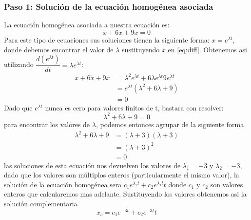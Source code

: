     \subsubsection*{Paso 1: Solución de la ecuación homogénea asociada}
        La ecuación homogénea asociada a nuestra ecuación es:
        \begin{equation}
            \ddot{x} + 6\dot{x} + 9x = 0
            \label{eq:diff}
        \end{equation}
        Para este tipo de ecuaciones sus soluciones tienen la siguiente forma: $x = e^{\lambda t} $, donde debemos encontrar el
        valor de $\lambda$ sustituyendo $ x $ en \eqref{eq:diff}. Obtenemos asi utilizando 
        $\dfrac {d( e^{\lambda t} )}{d t}=\lambda e^{\lambda t}$:
        \begin{equation*}
            \begin{split}
                \ddot{x} + 6\dot{x} + 9x & = \lambda^2 e^{\lambda t} + 6\lambda e^{\lambda t} 9 e^{\lambda t}\\
                & = e^{\lambda t}(\lambda^2 + 6\lambda + 9) \\
                & = 0
            \end{split}
        \end{equation*}
        Dado que $ e^{\lambda t} $ nunca es cero para valores finitos de t, bastara con resolver:
        \begin{equation*}
            \lambda^2 + 6\lambda + 9 = 0
        \end{equation*}
        para encontrar los valores de $\lambda$, podemos entonces agrupar de la siguiente forma
        \begin{equation*}
            \begin{split}
                \lambda^2 + 6\lambda + 9 & = (\lambda + 3)(\lambda + 3)\\
                & = (\lambda + 3)^2 \\
                & = 0
            \end{split}
        \end{equation*}
        las soluciones de esta ecuación nos devuelven los valores de $\lambda_1 = -3$ y $\lambda_2 = -3$, dado que los valores son múltiplos
        enteros (particularmente el mismo valor), la solución de la ecuación homogénea sera $ c_1 e^{\lambda_1 t} + c_2 e^{\lambda_1 t} t$
        donde $c_1$ y $c_2$ son valores enteros que calcularemos mas adelante. Sustituyendo los valores obtenemos asi la solución 
        complementaria
        \begin{equation}
            x_c = c_1 e^{-3 t} + c_2 e^{-3 t} t
            \label{eq:xc}
        \end{equation}

